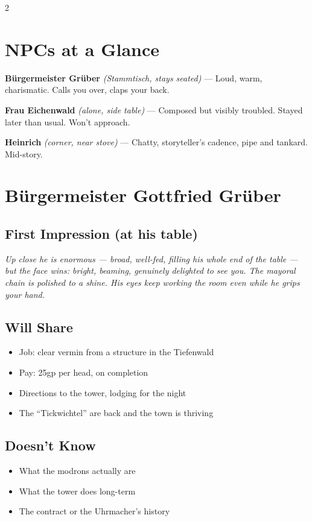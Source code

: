 \documentclass[10pt,letterpaper]{article}
\newcommand{\npc}[3]{\textbf{#1} \textit{(#2)} --- #3}
\begin{document}
\begin{multicols}{2}
\section*{NPCs at a Glance}

\npc{Bürgermeister Grüber}{Stammtisch, stays seated}{Loud, warm, charismatic. Calls you over, claps your back.}

\npc{Frau Eichenwald}{alone, side table}{Composed but visibly troubled. Stayed later than usual. Won't approach.}

\npc{Heinrich}{corner, near stove}{Chatty, storyteller's cadence, pipe and tankard. Mid-story.}

\section*{Bürgermeister Gottfried Grüber}
\subsection*{First Impression (at his table)}
\begin{readaloud}
\itshape
Up close he is enormous --- broad, well-fed, filling his whole end of the table --- but the face wins: bright, beaming, genuinely delighted to see you. The mayoral chain is polished to a shine. His eyes keep working the room even while he grips your hand.
\end{readaloud}
\subsection*{Will Share}
\begin{itemize}
\item Job: clear vermin from a structure in the Tiefenwald
\item Pay: 25gp per head, on completion
\item Directions to the tower, lodging for the night
\item The ``Tickwichtel'' are back and the town is thriving
\end{itemize}
\subsection*{Doesn't Know}
\begin{itemize}
\item What the modrons actually are
\item What the tower does long-term
\item The contract or the Uhrmacher's history
\end{itemize}

\end{multicols}
\end{document}
